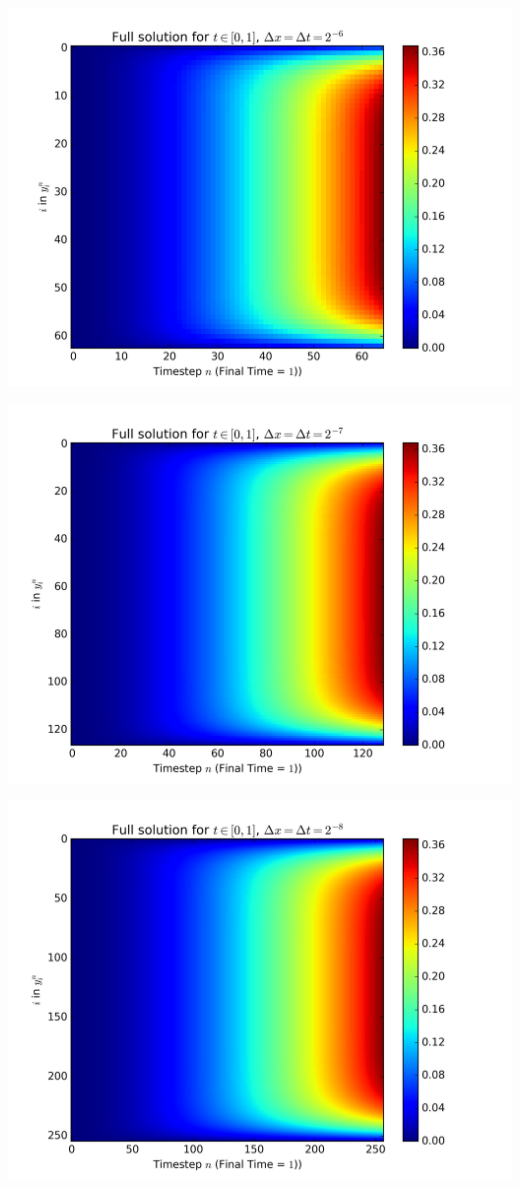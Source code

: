 \documentclass{article} %
\theoremstyle{plain}
\numberwithin{equation}{section} %
\numberwithin{figure}{section} %
\numberwithin{table}{section} %
\begin{document}
\begin{minipage}{0.5\textwidth}
    \includegraphics[width=\textwidth]{problem_2_3.png}
\end{minipage}
\begin{minipage}{0.5\textwidth}
    \includegraphics[width=\textwidth]{problem_2_4.png}
\end{minipage}\hfill
\begin{minipage}{0.5\textwidth}
    \includegraphics[width=\textwidth]{problem_2_5.png}
\end{minipage}
\end{document}
